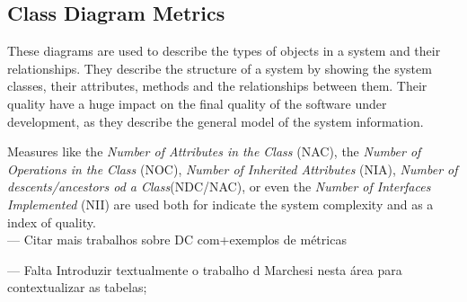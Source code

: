 \subsection{Class Diagram Metrics}


These diagrams are used to describe the types of objects in a system and their relationships.
They describe the structure of a system by showing the system classes, their attributes, methods and the relationships between them.
Their quality have a huge impact on the final quality of the software under development, as they describe the general model of the system information.

Measures like the \emph{Number of Attributes in the Class} (NAC), the \emph{Number of Operations in the Class} (NOC), \emph{Number of Inherited Attributes } (NIA), \emph{Number of descents/ancestors od a Class}(NDC/NAC), or even the \emph{Number of Interfaces Implemented} (NII) are used both for indicate the system complexity and as a index of quality.\\


--- Citar mais trabalhos sobre DC com+exemplos de métricas %

 --- Falta Introduzir textualmente o trabalho d Marchesi nesta área para contextualizar as tabelas;


